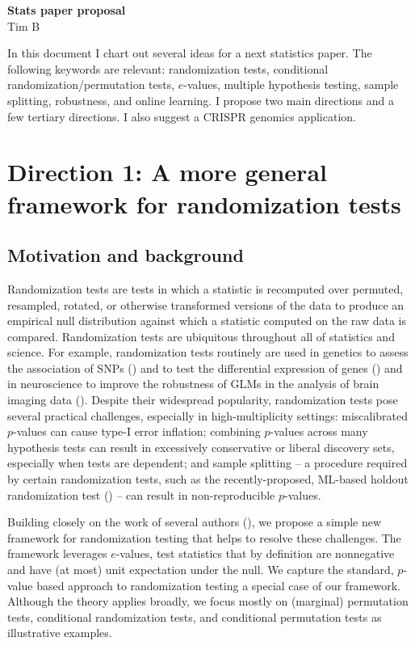 \documentclass[12pt]{article}
\begin{document}
\begin{center}
\textbf{Stats paper proposal} \\
Tim B
\end{center}

In this document I chart out several ideas for a next statistics paper. The following keywords are relevant: randomization tests, conditional randomization/permutation tests, $e$-values, multiple hypothesis testing, sample splitting, robustness, and online learning. I propose two main directions and a few tertiary directions. I also suggest a CRISPR genomics application.

\section*{Direction 1: A more general framework for randomization tests}

\subsection*{Motivation and background}

Randomization tests are tests in which a statistic is recomputed over permuted, resampled, rotated, or otherwise transformed versions of the data to produce an empirical null distribution against which a statistic computed on the raw data is compared. Randomization tests are ubiquitous throughout all of statistics and science. For example, randomization tests routinely are used in genetics to assess the association of SNPs (\cite{Johnson2010}) and to test the differential expression of genes (\cite{Maleki2020}) and in neuroscience to improve the robustness of GLMs in the analysis of brain imaging data (\cite{Winkler2014}). %
Despite their widespread popularity, randomization tests pose several practical challenges, especially in high-multiplicity settings: miscalibrated $p$-values can cause type-I error inflation; combining $p$-values across many hypothesis tests can result in excessively conservative or liberal discovery sets, especially when tests are dependent; and sample splitting -- a procedure required by certain randomization tests, such as the recently-proposed, ML-based holdout randomization test (\cite{Tansey2021a}) -- can result in non-reproducible $p$-values.

Building closely on the work of several authors (\cite{Wang2020b,Vovk2020,Vovk2021b}), we propose a simple new framework for randomization testing that helps to resolve these challenges. The framework leverages $e$-values, test statistics that by definition are nonnegative and have (at most) unit expectation under the null. We capture the standard, $p$-value based approach to randomization testing a special case of our framework. Although the theory applies broadly, we focus mostly on (marginal) permutation tests, conditional randomization tests, and conditional permutation tests as illustrative examples.
\end{document}
